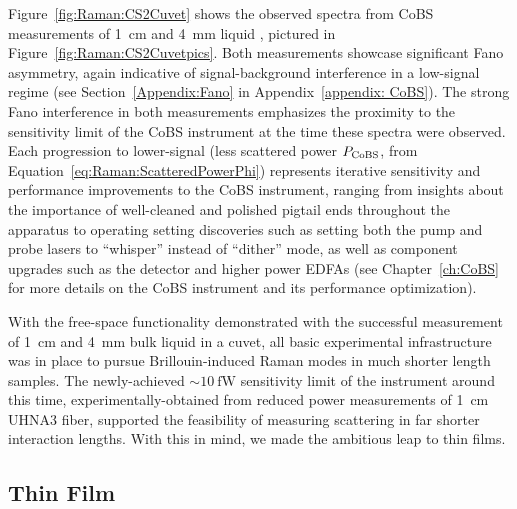 Figure~\ref{fig:Raman:CS2Cuvet} shows the observed spectra from \ac{CoBS} measurements of \SI{1}{\centi\meter} and \SI{4}{\milli\meter} liquid , pictured in Figure~\ref{fig:Raman:CS2Cuvetpics}. Both measurements showcase significant Fano asymmetry, again indicative of signal-background interference in a low-signal regime (see Section~\ref{Appendix:Fano} in Appendix~\ref{appendix: CoBS}). The strong Fano interference in both measurements emphasizes the proximity to the sensitivity limit of the \ac{CoBS} instrument at the time these spectra were observed. Each progression to lower-signal (less scattered power \(P_{\rm CoBS}\), from Equation~\ref{eq:Raman:ScatteredPowerPhi}) represents iterative sensitivity and performance improvements to the \ac{CoBS} instrument, ranging from insights about the importance of well-cleaned and polished pigtail ends throughout the apparatus to operating setting discoveries such as setting both the pump and probe lasers to ``whisper'' instead of ``dither'' mode, as well as component upgrades such as the detector and higher power \ac{EDFA}s (see Chapter~\ref{ch:CoBS} for more details on the \ac{CoBS} instrument and its performance optimization).

With the free-space functionality demonstrated with the successful measurement of \SI{1}{\centi\meter} and \SI{4}{\milli\meter} bulk liquid  in a cuvet, all basic experimental infrastructure was in place to pursue Brillouin-induced Raman modes in much shorter length samples. The newly-achieved \(\sim\SI{10}{\femto\watt}\) sensitivity limit of the instrument around this time, experimentally-obtained from reduced power measurements of \SI{1}{\centi\meter} \ac{UHNA3} fiber, supported the feasibility of measuring scattering in far shorter interaction lengths. With this in mind, we made the ambitious leap to thin films.

\subsection{ Thin Film}
\label{subsec:Raman:Target:TeO2}

